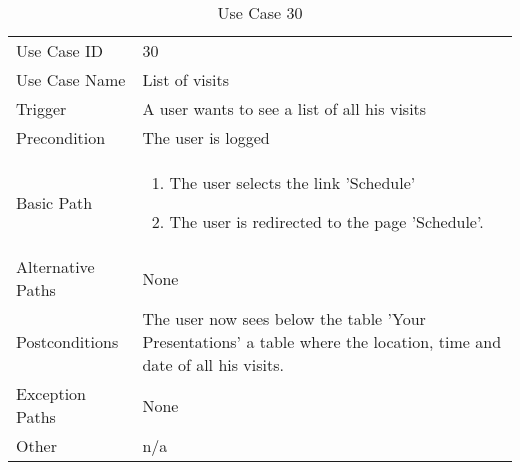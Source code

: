 \begin{table}[H]
\centering
\label{table-use-case-30}
\begin{tabular}{|p{3cm}|p{10cm}}
Use Case ID       & 30                                                        \\
Use Case Name     & List of visits                          \\
Trigger           & A user wants to see a list of all his visits  \\
Precondition      & The user is logged             \\
Basic Path        & \begin{enumerate}
\item The user selects the link 'Schedule' 
\item The user is redirected to the page 'Schedule'. 
\end{enumerate} 
     \\
Alternative Paths & None                          \\
Postconditions    & The user now sees below the table 'Your Presentations' a
table where the location, time and date of all his visits.
\\
Exception Paths   & None			\\
Other             & n/a                                                                                                                                                                                                        
\end{tabular}
\caption{Use Case 30}
\end{table}


